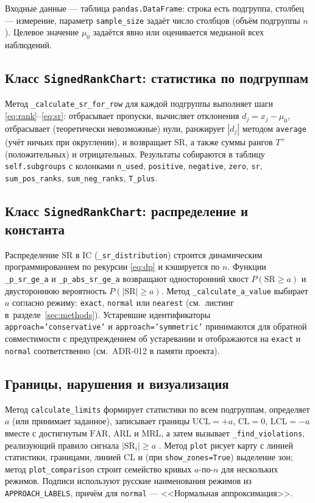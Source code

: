 \documentclass[11pt,a4paper]{article}
\newcommand{\SR}{\mathrm{SR}}
\newcommand{\FAR}{\mathrm{FAR}}
\newcommand{\ARL}{\mathrm{ARL}}
\newcommand{\MRL}{\mathrm{MRL}}
\begin{document}
Входные данные --- таблица \texttt{pandas.DataFrame}: строка есть подгруппа,
столбец --- измерение, параметр \texttt{sample\_size} задаёт число
столбцов (объём подгруппы $n$). Целевое значение $\mu_0$ задаётся явно или
оценивается медианой всех наблюдений.

\subsection{Класс \texttt{SignedRankChart}: статистика по подгруппам}
\label{sec:impl-stat}

Метод \texttt{\_calculate\_sr\_for\_row} для каждой подгруппы выполняет
шаги \eqref{eq:rank}--\eqref{eq:sr}: отбрасывает пропуски, вычисляет
отклонения $d_j=x_j-\mu_0$, отбрасывает (теоретически невозможные) нули,
ранжирует $|d_j|$ методом \texttt{average} (учёт ничьих при округлении),
и возвращает $\SR$, а также суммы рангов $T^+$ (положительных) и
отрицательных. Результаты собираются в таблицу \texttt{self.subgroups} с
колонками \texttt{n\_used}, \texttt{positive}, \texttt{negative},
\texttt{zero}, \texttt{sr}, \texttt{sum\_pos\_ranks},
\texttt{sum\_neg\_ranks}, \texttt{T\_plus}.

\subsection{Класс \texttt{SignedRankChart}: распределение и константа}
\label{sec:impl-dist}

Распределение $\SR$ в IC (\texttt{\_sr\_distribution}) строится
динамическим программированием по рекурсии \eqref{eq:dp} и кэшируется по
$n$. Функции \texttt{\_p\_sr\_ge\_a} и \texttt{\_p\_abs\_sr\_ge\_a}
возвращают односторонний хвост $P(\SR\ge a)$ и двустороннюю вероятность
$P(|\SR|\ge a)$. Метод \texttt{\_calculate\_a\_value} выбирает $a$
согласно режиму: \texttt{exact}, \texttt{normal} или
\texttt{nearest} (см.~листинг в~разделе~\ref{sec:methods}). Устаревшие
идентификаторы \texttt{approach='conservative'} и
\texttt{approach='symmetric'} принимаются для обратной совместимости с
предупреждением об устаревании и отображаются на \texttt{exact} и
\texttt{normal} соответственно (см.~ADR-012 в памяти проекта).

\subsection{Границы, нарушения и визуализация}
\label{sec:impl-plot}

Метод \texttt{calculate\_limits} формирует статистики по всем подгруппам,
определяет $a$ (или принимает заданное), записывает границы
$\mathrm{UCL}=+a$, $\mathrm{CL}=0$, $\mathrm{LCL}=-a$ вместе с
достигнутым $\FAR$, $\ARL$ и $\MRL$, а затем вызывает
\texttt{\_find\_violations}, реализующий правило сигнала
$|\SR_i|\ge a$ \cite[\S4.2.1.2.1, ур.~4.6, с.~198]{Chakraborti2019}.
Метод \texttt{plot} рисует карту с линией статистики, границами, линией
$\mathrm{CL}$ и (при \texttt{show\_zones=True}) выделение зон; метод
\texttt{plot\_comparison} строит семейство кривых $a$-по-$n$ для нескольких
режимов. Подписи используют русские наименования режимов из
\texttt{APPROACH\_LABELS}, причём для \texttt{normal} ---
<<Нормальная аппроксимация>>.
\end{document}

